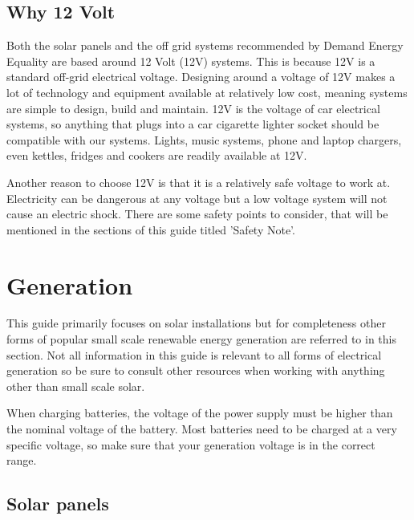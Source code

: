 \documentclass{article}
\theoremstyle{definition}
\theoremstyle{definition}
\theoremstyle{remark}
\begin{document}
  {\color{blue}\subsection{Why 12 Volt}} %
  \label{sub:why_12_volt}

    Both the solar panels and the off grid systems recommended by Demand Energy Equality are based around 12 Volt (12V) systems. This is because 12V is a standard off-grid electrical voltage. Designing around a voltage of 12V makes a lot of technology and equipment available at relatively low cost, meaning systems are simple to design, build and maintain. 12V is the voltage of car electrical systems, so anything that plugs into a car cigarette lighter socket should be compatible with our systems. Lights, music systems, phone and laptop chargers, even kettles, fridges and cookers are readily available at 12V. 

    Another reason to choose 12V is that it is a relatively safe voltage to work at. Electricity can be dangerous at any voltage but a low voltage system will not cause an electric shock. There are some safety points to consider, that will be mentioned in the sections of this guide titled 'Safety Note'.



{\color{blue}\section{Generation}} %
\label{sec:generation}

  This guide primarily focuses on solar installations but for completeness other forms of popular small scale renewable energy generation are referred to in this section. Not all information in this guide is relevant to all forms of electrical generation so be sure to consult other resources when working with anything other than small scale solar.

  When charging batteries, the voltage of the power supply must be higher than the nominal voltage of the battery. Most batteries need to be charged at a very specific voltage, so make sure that your generation voltage is in the correct range. 

  {\color{blue}\subsection{Solar panels}} %
  \label{sub:solar_panels}
\end{document}
